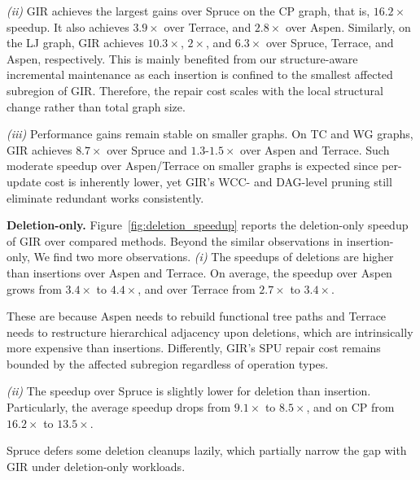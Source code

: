 \textit{(ii)} GIR achieves the largest gains over Spruce
on the CP graph, that is, $16.2\times$ speedup.
It also achieves $3.9\times$ over Terrace, and $2.8\times$ over Aspen.
Similarly, on the LJ graph, GIR achieves $10.3\times$, $2\times$, and $6.3\times$ over Spruce, Terrace, and Aspen, respectively.
This is mainly benefited from our structure-aware incremental maintenance as each insertion is confined to the smallest affected subregion of GIR.
Therefore, the repair cost scales with the local structural change rather than total graph size.

\begin{maybecut}
\textit{(iii)} Performance gains remain stable on smaller graphs.
On TC and WG graphs, GIR achieves $8.7\times$ over Spruce and $1.3$-$1.5\times$ over Aspen and Terrace.
Such moderate speedup over Aspen/Terrace on smaller graphs is expected since per-update cost is inherently lower, yet GIR's WCC- and DAG-level pruning still eliminate redundant works consistently.
\end{maybecut}



\textbf{Deletion-only.}
Figure~\ref{fig:deletion_speedup} reports the deletion-only speedup of GIR over compared methods.
Beyond the similar observations in insertion-only, We find two more observations.
\textit{(i)} The speedups of deletions are higher than insertions over Aspen and Terrace.
On average, the speedup over Aspen grows from $3.4\times$ to $4.4\times$, and over Terrace from $2.7\times$ to $3.4\times$.
\begin{maybecut}
These are because Aspen needs to rebuild functional tree paths
and Terrace needs to restructure hierarchical adjacency upon deletions, which are intrinsically more expensive than insertions.
Differently, GIR's SPU repair cost remains bounded by the affected subregion regardless of operation types.
\end{maybecut}
\textit{(ii)} The speedup over Spruce is slightly lower for deletion than insertion.
Particularly, the average speedup drops from $9.1\times$ to $8.5\times$, and on CP from $16.2\times$ to $13.5\times$.
\begin{maybecut}
Spruce defers some deletion cleanups lazily, which partially narrow the gap with GIR under deletion-only workloads.
\end{maybecut}

